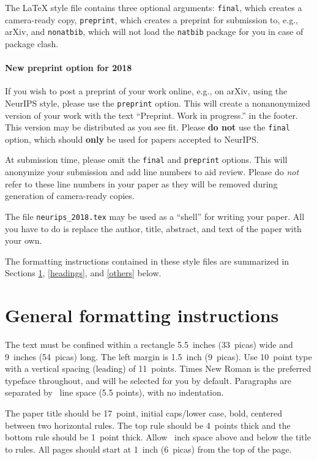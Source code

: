 \documentclass{article}
\begin{document}
The \LaTeX{} style file contains three optional arguments: \verb+final+, which
creates a camera-ready copy, \verb+preprint+, which creates a preprint for
submission to, e.g., arXiv, and \verb+nonatbib+, which will not load the
\verb+natbib+ package for you in case of package clash.

\paragraph{New preprint option for 2018}
If you wish to post a preprint of your work online, e.g., on arXiv, using the
NeurIPS style, please use the \verb+preprint+ option. This will create a
nonanonymized version of your work with the text ``Preprint. Work in progress.''
in the footer. This version may be distributed as you see fit. Please \textbf{do
  not} use the \verb+final+ option, which should \textbf{only} be used for
papers accepted to NeurIPS.

At submission time, please omit the \verb+final+ and \verb+preprint+
options. This will anonymize your submission and add line numbers to aid
review. Please do \emph{not} refer to these line numbers in your paper as they
will be removed during generation of camera-ready copies.

The file \verb+neurips_2018.tex+ may be used as a ``shell'' for writing your
paper. All you have to do is replace the author, title, abstract, and text of
the paper with your own.

The formatting instructions contained in these style files are summarized in
Sections \ref{gen_inst}, \ref{headings}, and \ref{others} below.

\section{General formatting instructions}
\label{gen_inst}

The text must be confined within a rectangle 5.5~inches (33~picas) wide and
9~inches (54~picas) long. The left margin is 1.5~inch (9~picas).  Use 10~point
type with a vertical spacing (leading) of 11~points.  Times New Roman is the
preferred typeface throughout, and will be selected for you by default.
Paragraphs are separated by ~line space (5.5 points), with no
indentation.

The paper title should be 17~point, initial caps/lower case, bold, centered
between two horizontal rules. The top rule should be 4~points thick and the
bottom rule should be 1~point thick. Allow ~inch space above and
below the title to rules. All pages should start at 1~inch (6~picas) from the
top of the page.
\end{document}
